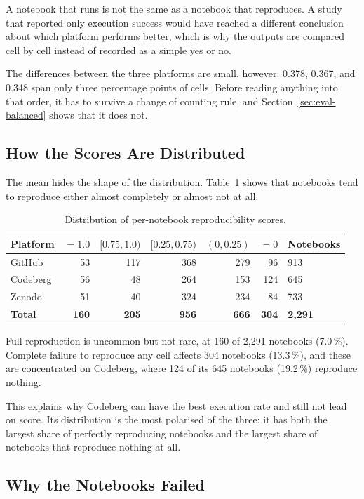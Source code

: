 A notebook that runs is not the same as a notebook that reproduces. A study that reported only execution success would have reached a different conclusion about which platform performs better, which is why the outputs are compared cell by cell instead of recorded as a simple yes or no.

The differences between the three platforms are small, however: 0.378, 0.367, and 0.348 span only three percentage points of cells. Before reading anything into that order, it has to survive a change of counting rule, and Section~\ref{sec:eval-balanced} shows that it does not.

\subsection{How the Scores Are Distributed}

The mean hides the shape of the distribution. Table~\ref{tab:repro-distribution} shows that notebooks tend to reproduce either almost completely or almost not at all.

\begin{table}[htbp]
\centering
\caption{Distribution of per-notebook reproducibility scores.}
\label{tab:repro-distribution}
\small
\begin{tabularx}{\textwidth}{@{}l r r r r r X@{}}
\toprule
Platform & $=1.0$ & $[0.75,1.0)$ & $[0.25,0.75)$ & $(0,0.25)$ & $=0$ & Notebooks\tabularnewline
\midrule
GitHub & 53 & 117 & 368 & 279 & 96 & 913\tabularnewline
Codeberg & 56 & 48 & 264 & 153 & 124 & 645\tabularnewline
Zenodo & 51 & 40 & 324 & 234 & 84 & 733\tabularnewline
\midrule
\textbf{Total} & \textbf{160} & \textbf{205} & \textbf{956} & \textbf{666} & \textbf{304} & \textbf{2{,}291}\tabularnewline
\bottomrule
\end{tabularx}
\end{table}

Full reproduction is uncommon but not rare, at 160 of 2{,}291 notebooks (7.0\,\%). Complete failure to reproduce any cell affects 304 notebooks (13.3\,\%), and these are concentrated on Codeberg, where 124 of its 645 notebooks (19.2\,\%) reproduce nothing.

This explains why Codeberg can have the best execution rate and still not lead on score. Its distribution is the most polarised of the three: it has both the largest share of perfectly reproducing notebooks and the largest share of notebooks that reproduce nothing at all.

\subsection{Why the Notebooks Failed}

